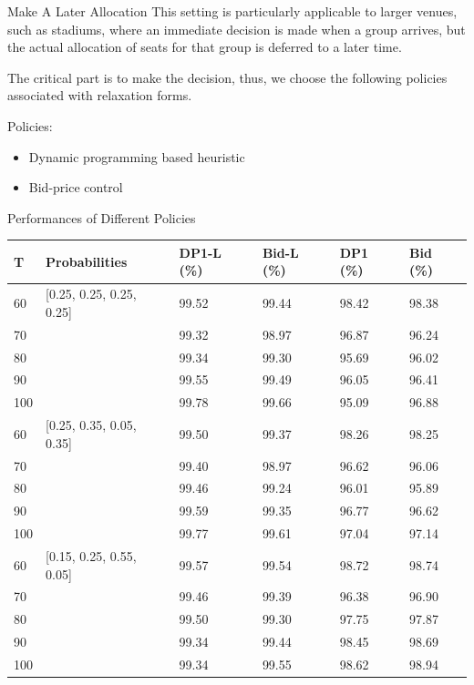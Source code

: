     \begin{frame}{Make A Later Allocation}
      This setting is particularly applicable to larger venues, such as stadiums, where an immediate decision is made when a group arrives, but the actual allocation of seats for that group is deferred to a later time.

      \vspace{0.5cm}

      The critical part is to make the decision, thus, we choose the following policies associated with relaxation forms.

      \vspace{0.5cm}

      Policies: 

      \begin{itemize}
        \item Dynamic programming based heuristic
        \item Bid-price control
      \end{itemize}
    \end{frame}

      \begin{frame}{Performances of Different Policies}
        \scriptsize
        \begin{table}[ht]
          \centering
          \begin{tabular}{|l|l|l|l|l|l|}
          \hline
           T & Probabilities &  DP1-L (\%) & Bid-L (\%) & DP1 (\%) & Bid (\%) \\
          \hline
          60  & [0.25, 0.25, 0.25, 0.25]  & 99.52 & 99.44 & 98.42 & 98.38 \\
          70  &   & 99.32 & 98.97 & 96.87 & 96.24 \\
          80  &   & 99.34 & 99.30 & 95.69 & 96.02 \\
          90  &   & 99.55 & 99.49 & 96.05 & 96.41  \\
          100 &   & 99.78 & 99.66 & 95.09 & 96.88 \\
          \hline
          60  & [0.25, 0.35, 0.05, 0.35]  & 99.50 & 99.37 & 98.26 & 98.25  \\
          70  &   & 99.40 & 98.97 & 96.62 & 96.06 \\
          80  &   & 99.46 & 99.24 & 96.01 & 95.89 \\
          90  &   & 99.59 & 99.35 & 96.77 & 96.62 \\
          100 &   & 99.77 & 99.61 & 97.04 & 97.14  \\
          \hline
          60  & [0.15, 0.25, 0.55, 0.05]  & 99.57 & 99.54 & 98.72 & 98.74 \\
          70  &   & 99.46 & 99.39  & 96.38 & 96.90 \\
          80  &   & 99.50 & 99.30  & 97.75 & 97.87 \\
          90  &   & 99.34 & 99.44  & 98.45 & 98.69 \\
          100 &   & 99.34 & 99.55  & 98.62 & 98.94 \\
          \hline
          \end{tabular}
        \end{table}

    \end{frame}